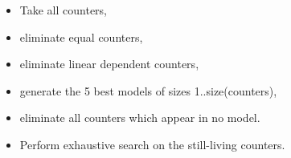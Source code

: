 \begin{itemize}

\item Take all counters,

\item eliminate equal counters,

\item eliminate linear dependent counters,

\item generate the 5 best models of sizes 1..size(counters),

\item eliminate all counters which appear in no model.

\item Perform exhaustive search on the still-living counters.

\end{itemize}


